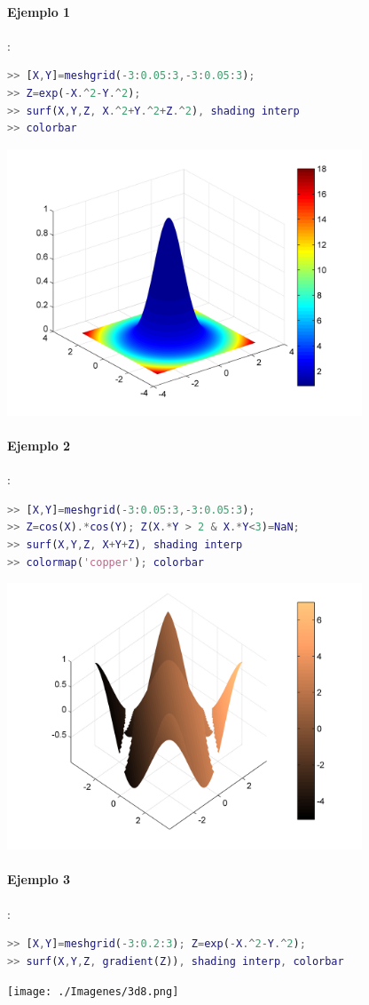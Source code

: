\paragraph{Ejemplo 1}:
\begin{lstlisting}[language=Matlab]
>> [X,Y]=meshgrid(-3:0.05:3,-3:0.05:3);
>> Z=exp(-X.^2-Y.^2);
>> surf(X,Y,Z, X.^2+Y.^2+Z.^2), shading interp
>> colorbar
\end{lstlisting}
\includegraphics[width=300pt]{./Imagenes/3d6.png}

\paragraph{Ejemplo 2}:
\begin{lstlisting}[language=Matlab]
>> [X,Y]=meshgrid(-3:0.05:3,-3:0.05:3);
>> Z=cos(X).*cos(Y); Z(X.*Y > 2 & X.*Y<3)=NaN;
>> surf(X,Y,Z, X+Y+Z), shading interp
>> colormap('copper'); colorbar
\end{lstlisting}
\includegraphics[width=300pt]{./Imagenes/3d7.png}

\paragraph{Ejemplo 3}:
\begin{lstlisting}[language=Matlab]
>> [X,Y]=meshgrid(-3:0.2:3); Z=exp(-X.^2-Y.^2);
>> surf(X,Y,Z, gradient(Z)), shading interp, colorbar
\end{lstlisting}
\texttt{[image: ./Imagenes/3d8.png]}

